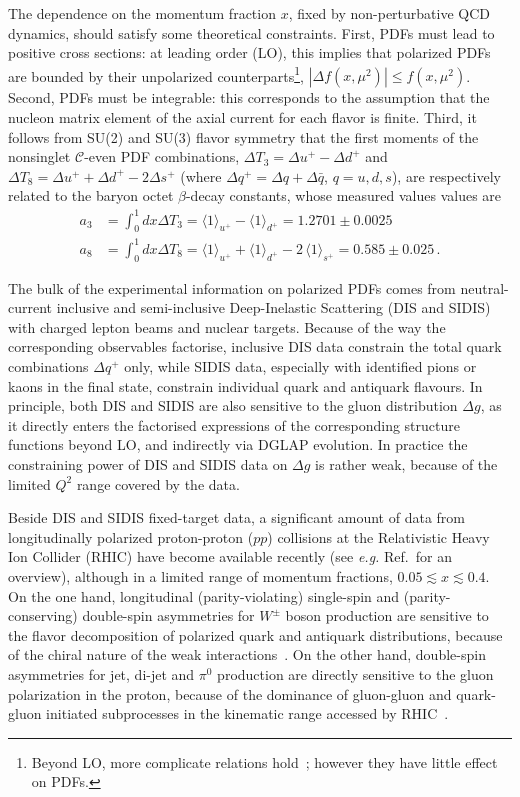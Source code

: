 The dependence on the momentum fraction $x$, fixed by non-perturbative QCD 
dynamics, should satisfy some theoretical constraints.
%
First, PDFs must lead to positive cross sections: 
at leading order (LO), this implies that polarized 
PDFs are bounded by their unpolarized counterparts\footnote{Beyond LO, more 
complicate relations hold~\cite{Altarelli:1998gn}; however they have little
effect on PDFs.}, $|\Delta f(x,\mu^2)|\leq f(x,\mu^2)$.
%
Second, PDFs must be integrable: this corresponds to the assumption 
that the nucleon matrix element of the axial current for each flavor is finite.
%
Third, it follows from SU(2) and SU(3) flavor symmetry that 
the first moments of the nonsinglet $\mathcal{C}$-even PDF combinations,
$\Delta T_3=\Delta u^+ -\Delta d^+$ and 
$\Delta T_8 = \Delta u^+ +\Delta d^+ -2\Delta s^+$ 
(where $\Delta q^+=\Delta q+\Delta\bar{q}$, $q=u,d,s$), are respectively
related to the baryon octet $\beta$-decay constants, whose 
measured values values are~\cite{Olive:2016xmw}
\begin{align}
 a_3
 & =
 \int_0^1 dx \Delta T_3 
 = \langle 1\rangle_{u^+} - \langle 1\rangle_{d^+}  = 1.2701 \pm 0.0025\\
 a_8
 & =
 \int_0^1 dx \Delta T_8 
 = \langle 1 \rangle_{u^+} + \langle 1 \rangle_{d^+} -2\,\langle 1 \rangle_{s^+} 
 =0.585  \pm 0.025
 \,\mbox{.}
\label{eq:decayconst}
\end{align}

The bulk of the experimental information on polarized PDFs comes from 
neutral-current inclusive and semi-inclusive Deep-Inelastic Scattering 
(DIS and SIDIS) with charged lepton beams and nuclear targets. 
%
Because of the way the corresponding observables factorise, inclusive DIS 
data constrain the total quark combinations $\Delta q^+$ only, 
while SIDIS data, especially with identified pions or kaons in the final state, 
constrain individual quark and antiquark flavours. 
%
In principle, both DIS and SIDIS are also sensitive to the gluon 
distribution $\Delta g$, as it directly enters the factorised expressions of
the corresponding structure functions beyond LO, and indirectly via DGLAP 
evolution.
%
In practice the constraining power of DIS and SIDIS data on $\Delta g$ is 
rather weak, because of the limited $Q^2$ range covered by the data. 

Beside DIS and SIDIS fixed-target data, a significant amount of data from
longitudinally polarized proton-proton ($pp$) collisions at the Relativistic 
Heavy Ion Collider (RHIC) have become available recently (see {\it e.g.} 
Ref.~\cite{Aschenauer:2015eha}for an overview), although in a limited range 
of momentum fractions, $0.05\lesssim x \lesssim 0.4$.
%
On the one hand, longitudinal (parity-violating) single-spin and 
(parity-conserving) double-spin asymmetries for $W^\pm$ boson production are 
sensitive to the flavor decomposition of polarized quark and antiquark 
distributions, because of the chiral nature of the weak 
interactions~\cite{Bourrely:1993dd}. 
%
On the other hand, double-spin asymmetries for jet, di-jet and $\pi^0$ 
production are directly sensitive to the gluon polarization in 
the proton, because of the dominance of gluon-gluon and quark-gluon initiated 
subprocesses in the kinematic range accessed by RHIC~\cite{Bourrely:1990pz}.

